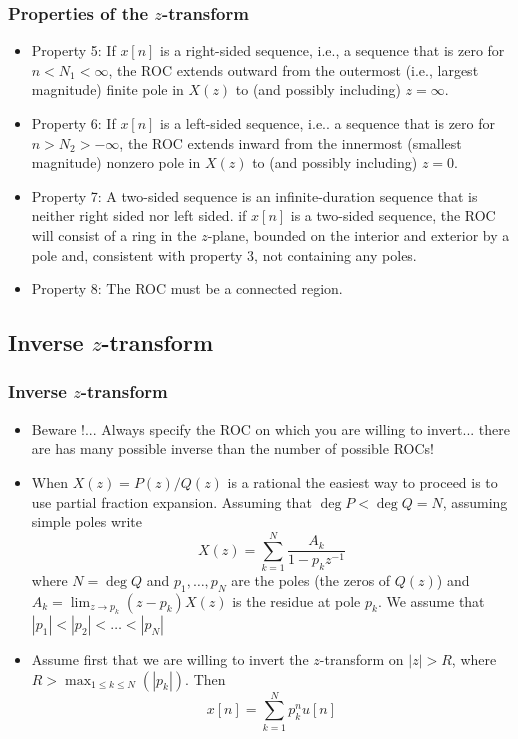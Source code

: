 \begin{frame}
\frametitle{Properties of the $z$-transform}
\begin{itemize}
\item \alert{Property 5}: If $x[n]$ is a \alert{right-sided sequence}, i.e., a sequence that is zero for $ n<N_{1}<\infty$, the ROC extends outward from the \alert{outermost} (i.e., largest magnitude) finite pole in $X(z)$ to (and possibly including) $ z=\infty$.
\item \alert{Property 6}: If $x[n]$ is a \alert{left-sided sequence}, i.e.. a sequence that is zero for $n>  N_{2}>-\infty$, the ROC extends inward from the \alert{innermost} (smallest magnitude) nonzero pole in $X(z)$ to (and possibly including) $z=0$.
\item \alert{Property 7}: A \alert{two-sided sequence} is an infinite-duration sequence that is neither right sided nor left sided. if $x[n]$ is a two-sided sequence, the ROC will consist of a ring in the $z$-plane, bounded on the interior and exterior by a pole and, consistent with property 3, not containing any poles.
\item \alert{Property 8}: The ROC must be a connected region.
\end{itemize}
\end{frame}
\subsection{Inverse $z$-transform}
\begin{frame}
\frametitle{Inverse $z$-transform}
\begin{itemize}
\item Beware !...  Always specify the ROC on which you are willing to invert... there are has many possible inverse than the number of possible ROCs!
\item When $X(z)= P(z)/Q(z)$ is a rational the easiest way to proceed is to use \alert{partial fraction expansion}. Assuming that $\deg P < \deg Q=N$, assuming simple poles write
\[
X(z)= \sum_{k=1}^N \frac{A_k}{1-p_k z^{-1}}
\]
where $N= \deg Q$ and $p_1,\dots,p_N$ are the \alert{poles} (the zeros of $Q(z)$) and $A_k= \lim_{z \to p_k} (z-p_k) X(z)$ is the 
\alert{residue} at pole $p_k$. We assume that $|p_1| < |p_2| < \dots <|p_N|$
\item Assume first that we are willing to invert the $z$-transform on $|z| > R$, where $R > \max_{1 \leq k \leq N}( |p_k|)$. Then
\[
x[n] = \sum_{k=1}^N p_k^n u[n] 
\]
\end{itemize}
\end{frame}

